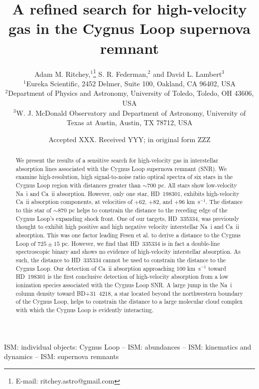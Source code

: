 \documentclass[fleqn,usenatbib]{mnras}
\title[High-velocity gas in the Cygnus Loop]{A refined search for high-velocity gas in the Cygnus Loop supernova remnant}
\author[A. M. Ritchey et al.]{
Adam M. Ritchey,$^{1}$\thanks{E-mail: ritchey.astro@gmail.com}
S. R. Federman,$^{2}$
and David L. Lambert$^{3}$
\\
$^{1}$Eureka Scientific, 2452 Delmer, Suite 100, Oakland, CA 96402, USA\\
$^{2}$Department of Physics and Astronomy, University of Toledo, Toledo, OH 43606, USA\\
$^{3}$W. J. McDonald Observatory and Department of Astronomy, University of Texas at Austin, Austin, TX 78712, USA
}
\date{Accepted XXX. Received YYY; in original form ZZZ}
\begin{document}
\label{firstpage}
\pagerange{\pageref{firstpage}--\pageref{lastpage}}
\maketitle

\begin{abstract}
We present the results of a sensitive search for high-velocity gas in interstellar absorption lines associated with the Cygnus Loop supernova remnant (SNR). We examine high-resolution, high signal-to-noise ratio optical spectra of six stars in the Cygnus Loop region with distances greater than $\sim$700 pc. All stars show low-velocity Na~{\sc i} and Ca~{\sc ii} absorption. However, only one star, HD~198301, exhibits high-velocity Ca~{\sc ii} absorption components, at velocities of +62, +82, and +96 km~s$^{-1}$. The distance to this star of $\sim$870 pc helps to constrain the distance to the receding edge of the Cygnus Loop's expanding shock front. One of our targets, HD~335334, was previously thought to exhibit high positive and high negative velocity interstellar Na~{\sc i} and Ca~{\sc ii} absorption. This was one factor leading Fesen et al. to derive a distance to the Cygnus Loop of $725\pm15$ pc. However, we find that HD~335334 is in fact a double-line spectroscopic binary and shows no evidence of high-velocity interstellar absorption. As such, the distance to HD~335334 cannot be used to constrain the distance to the Cygnus Loop. Our detection of Ca~{\sc ii} absorption approaching 100 km~s$^{-1}$ toward HD~198301 is the first conclusive detection of high-velocity absorption from a low ionization species associated with the Cygnus Loop SNR. A large jump in the Na~{\sc i} column density toward BD+31~4218, a star located beyond the northwestern boundary of the Cygnus Loop, helps to constrain the distance to a large molecular cloud complex with which the Cygnus Loop is evidently interacting.
\end{abstract}

\begin{keywords}
ISM: individual objects: Cygnus Loop -- ISM: abundances -- ISM: kinematics and dynamics -- ISM: supernova remnants
\end{keywords}


\end{document}
